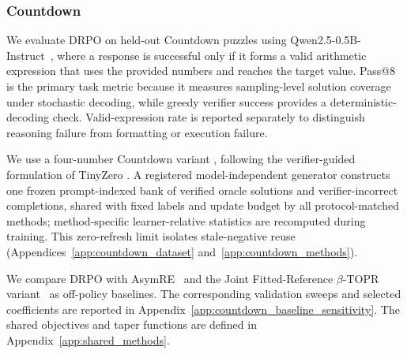 \documentclass{article}
\theoremstyle{plain}
\theoremstyle{definition}
\theoremstyle{remark}
\begin{document}
\subsubsection{Countdown}
\label{sec:countdown_performance}

We evaluate DRPO on held-out Countdown puzzles using
Qwen2.5-0.5B-Instruct~\citep{qwen2024qwen25}, where a response is
successful only if it forms a valid arithmetic expression that uses the
provided numbers and reaches the target value. Pass@8 is the primary task metric because it measures
sampling-level solution coverage under stochastic decoding, while
greedy verifier success provides a deterministic-decoding check.
Valid-expression rate is reported separately to distinguish reasoning
failure from formatting or execution failure.

We use a four-number Countdown variant \citep{hutton2002countdown}, following
the verifier-guided formulation of TinyZero \citep{pan2025tinyzero}. A
registered model-independent generator constructs one frozen prompt-indexed
bank of verified oracle solutions and verifier-incorrect completions, shared
with fixed labels and update budget by all protocol-matched methods;
method-specific learner-relative statistics are recomputed during training.
This zero-refresh limit isolates stale-negative reuse
(Appendices~\ref{app:countdown_dataset} and~\ref{app:countdown_methods}).

We compare DRPO with
AsymRE~\citep{arnal2025asymmetric} and
the Joint Fitted-Reference \(\beta\)-TOPR
variant~\citep{leroux2025tapered} as off-policy baselines.
The corresponding validation sweeps and selected coefficients are
reported in Appendix~\ref{app:countdown_baseline_sensitivity}.
The shared objectives and taper functions are defined in
Appendix~\ref{app:shared_methods}.
\end{document}
